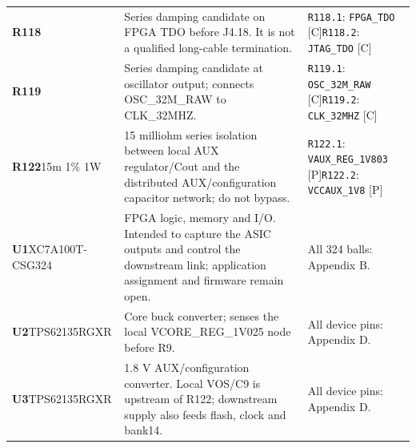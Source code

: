 \documentclass[11pt,a4paper]{article}
\begin{document}
\begin{longtable}{@{}P{27mm}P{83mm}P{58mm}@{}}
\textbf{R118} & Series damping candidate on FPGA TDO before J4.18. It is not a qualified long-cable termination. & \nolinkurl{R118.1}: \nolinkurl{FPGA_TDO} [C]\newline \nolinkurl{R118.2}: \nolinkurl{JTAG_TDO} [C] \\
\textbf{R119} & Series damping candidate at oscillator output; connects OSC\_32M\_RAW to CLK\_32MHZ. & \nolinkurl{R119.1}: \nolinkurl{OSC_32M_RAW} [C]\newline \nolinkurl{R119.2}: \nolinkurl{CLK_32MHZ} [C] \\
\textbf{R122}\newline 15m 1\% 1W & 15 milliohm series isolation between local AUX regulator/Cout and the distributed AUX/configuration capacitor network; do not bypass. & \nolinkurl{R122.1}: \nolinkurl{VAUX_REG_1V803} [P]\newline \nolinkurl{R122.2}: \nolinkurl{VCCAUX_1V8} [P] \\
\textbf{U1}\newline XC7A100T-CSG324 & FPGA logic, memory and I/O. Intended to capture the ASIC outputs and control the downstream link; application assignment and firmware remain open. & All 324 balls: Appendix B. \\
\textbf{U2}\newline TPS62135RGXR & Core buck converter; senses the local VCORE\_REG\_1V025 node before R9. & All device pins: Appendix D. \\
\textbf{U3}\newline TPS62135RGXR & 1.8 V AUX/configuration converter. Local VOS/C9 is upstream of R122; downstream supply also feeds flash, clock and bank14. & All device pins: Appendix D. \\

\end{longtable}
\end{document}
